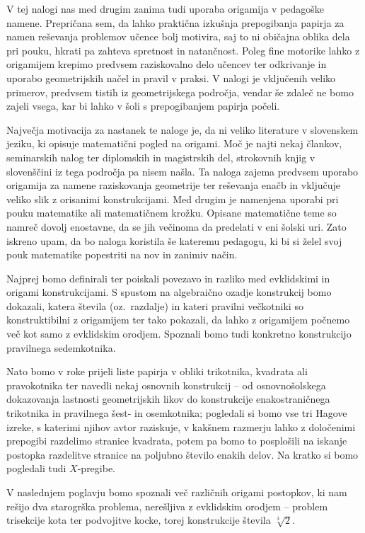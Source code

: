 V tej nalogi nas med drugim zanima tudi uporaba origamija v pedagoške namene. Prepričana sem, da lahko praktična izkušnja prepogibanja papirja za namen reševanja problemov učence bolj motivira, saj to ni običajna oblika dela pri pouku, hkrati pa zahteva spretnost in natančnost. Poleg fine motorike lahko z origamijem krepimo predvsem raziskovalno delo učencev ter odkrivanje in uporabo geometrijskih načel in pravil v praksi. V nalogi je vključenih veliko primerov, predvsem tistih iz geometrijskega področja, vendar še zdaleč ne bomo zajeli vsega, kar bi lahko v šoli s prepogibanjem papirja počeli.

Največja motivacija za nastanek te naloge je, da ni veliko literature v slovenskem jeziku, ki opisuje matematični pogled na origami. Moč je najti nekaj člankov, seminarskih nalog ter diplomskih in magistrskih del, strokovnih knjig v slovenščini iz tega področja pa nisem našla. Ta naloga zajema predvsem uporabo origamija za namene raziskovanja geometrije ter reševanja enačb in vključuje veliko slik z orisanimi konstrukcijami. Med drugim je namenjena uporabi pri pouku matematike ali matematičnem krožku. Opisane matematične teme so namreč dovolj enostavne, da se jih večinoma da predelati v eni šolski uri. Zato iskreno upam, da bo naloga koristila še kateremu pedagogu, ki bi si želel svoj pouk matematike popestriti na nov in zanimiv način.

Najprej bomo definirali ter poiskali povezavo in razliko med evklidskimi in origami konstrukcijami. S spustom na algebraično ozadje konstrukcij bomo dokazali, katera števila (oz.\ razdalje) in kateri pravilni večkotniki so konstruktibilni z origamijem ter tako pokazali, da lahko z origamijem počnemo več kot samo z evklidskim orodjem. Spoznali bomo tudi konkretno konstrukcijo pravilnega sedemkotnika.

Nato bomo v roke prijeli liste papirja v obliki trikotnika, kvadrata ali pravokotnika ter navedli nekaj osnovnih konstrukcij -- od osnovnošolskega dokazovanja lastnosti geometrijskih likov do konstrukcije enakostraničnega trikotnika in pravilnega šest- in osemkotnika; pogledali si bomo vse tri Hagove izreke, s katerimi njihov avtor raziskuje, v kakšnem razmerju lahko z določenimi prepogibi razdelimo stranice kvadrata, potem pa bomo to posplošili na iskanje postopka razdelitve stranice na poljubno število enakih delov. Na kratko si bomo pogledali tudi $X$-pregibe.

V naslednjem poglavju bomo spoznali več različnih origami postopkov, ki nam rešijo dva starogrška problema, nerešljiva z evklidskim orodjem -- problem trisekcije kota ter podvojitve kocke, torej konstrukcije števila $\sqrt[3]{2}$.


